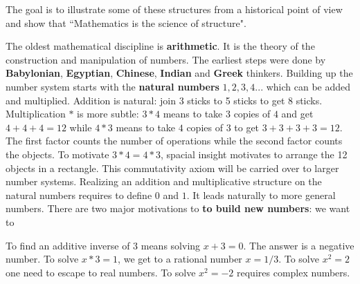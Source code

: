 \documentclass[12pt]{amsart}
\def\chapter#1{ \vspace{2mm} \begin{center} \fcolorbox{green1}{green1}{ \parbox{16.2cm}{{\Large {\bf #1}}}} \vspace{2mm} \end{center} }
\begin{document}
The goal is to illustrate some of these structures from a historical point of view
and show that ``Mathematics is the science of structure".


 \pagebreak
{}

\chapter{Lecture 2: Arithmetic}
The oldest mathematical discipline is {\bf arithmetic}. It is the theory of the construction and manipulation of numbers.
The earliest steps were done by {\bf Babylonian}, {\bf Egyptian}, {\bf Chinese}, {\bf Indian} and {\bf Greek} thinkers. 
Building up the number system starts with the {\bf natural numbers}  $1,2,3,4 ...$ which can be added and multiplied.
Addition is natural: join 3 sticks to 5 sticks to get 8 sticks.
Multiplication $*$ is more subtle: $3*4$ means to take $3$ copies of $4$ and 
get $4+4+4=12$ while $4*3$ means to take $4$ copies of $3$ to get $3+3+3+3=12$. The first factor counts the number of 
operations while the second factor counts the objects. To motivate $3*4=4*3$, spacial insight motivates to arrange 
the 12 objects in a rectangle. This commutativity axiom will be carried over to larger number systems. %
Realizing an addition and multiplicative structure on the natural numbers requires to define $0$ and $1$.
It leads naturally to more general numbers. There are two major motivations to {\bf to build new numbers}: we want to

\begin{center}  \end{center}

To find an additive inverse of $3$ means solving $x+3=0$. The answer is a negative number.
To solve $x*3=1$, we get to a rational number $x=1/3$. 
To solve $x^2=2$ one need to escape to real numbers. 
To solve $x^2=-2$ requires complex numbers. 
\end{document}
